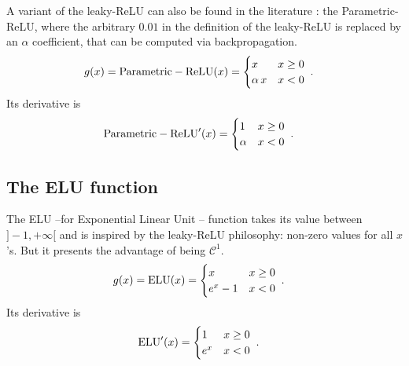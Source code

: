 A variant of the leaky-ReLU can also be found in the literature : the Parametric-ReLU, where the arbitrary $0.01$ in the definition of the leaky-ReLU is replaced by an $\alpha$ coefficient, that can be
computed via backpropagation.
\begin{align}
g(x)&={\rm Parametric-ReLU}(x)=\begin{cases} 
      x & x\geq 0 \\
      \alpha\,x & x<0 
   \end{cases}\;.
\end{align}
Its derivative is
\begin{align}
{\rm Parametric-ReLU}'(x)&=\begin{cases} 
      1 & x\geq 0 \\
      \alpha & x<0 
   \end{cases}\;.
\end{align}

\subsection{The ELU function}

The ELU --for Exponential Linear Unit -- function takes its value between $]-1,+\infty[$ and is inspired by the leaky-ReLU philosophy: non-zero values for all $x$'s. But it presents the advantage of being $\mathcal{C}^1$.
\begin{align}
g(x)&={\rm ELU}(x)=\begin{cases} 
      x & x\geq 0 \\
      e^x-1 & x<0 
   \end{cases}\;.
\end{align}
Its derivative is
\begin{align}
{\rm ELU}'(x)&=\begin{cases} 
      1 & x\geq 0 \\
      e^x & x<0 
   \end{cases}\;.
\end{align}


